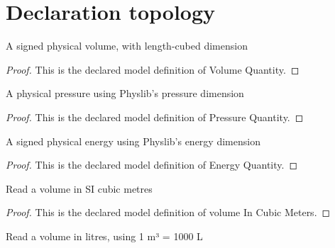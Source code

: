 \section{Declaration topology}
\begin{definition}
  \label{def:physics:phyx-mini-0337:phyxminiproblems-problemphyxmini0337-volumequantity}
  A signed physical volume, with length-cubed dimension
\end{definition}
\begin{proof}
  This is the declared model definition of Volume Quantity.
\end{proof}
\begin{definition}
  \label{def:physics:phyx-mini-0337:phyxminiproblems-problemphyxmini0337-pressurequantity}
  A physical pressure using Physlib's pressure dimension
\end{definition}
\begin{proof}
  This is the declared model definition of Pressure Quantity.
\end{proof}
\begin{definition}
  \label{def:physics:phyx-mini-0337:phyxminiproblems-problemphyxmini0337-energyquantity}
  A signed physical energy using Physlib's energy dimension
\end{definition}
\begin{proof}
  This is the declared model definition of Energy Quantity.
\end{proof}
\begin{definition}
  \label{def:physics:phyx-mini-0337:phyxminiproblems-problemphyxmini0337-volumeincubicmeters}
  Read a volume in SI cubic metres
\end{definition}
\begin{proof}
  This is the declared model definition of volume In Cubic Meters.
\end{proof}
\begin{definition}
  \label{def:physics:phyx-mini-0337:phyxminiproblems-problemphyxmini0337-volumeinliters}
  Read a volume in litres, using 1 m³ = 1000 L
\end{definition}
